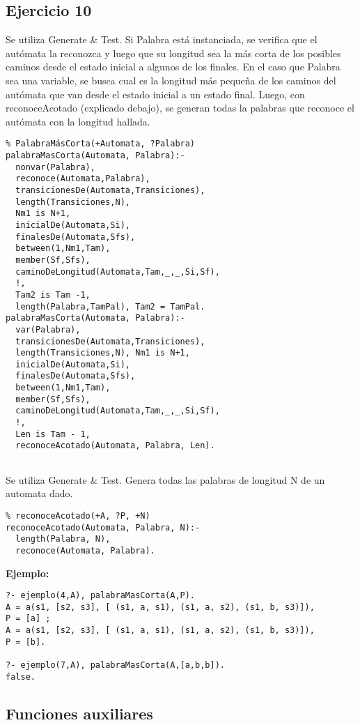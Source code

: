 \documentclass[10pt, a4paper,english,spanish,hidelinks]{article}
\begin{document}
\subsection{Ejercicio 10}

Se utiliza Generate \& Test.
Si Palabra está instanciada, se verifica que el autómata la reconozca y luego que su longitud sea
la más corta de los posibles caminos desde el estado inicial a algunos de los finales.
En el caso que Palabra sea una variable, se busca cual es la longitud más pequeña de los caminos del autómata
que van desde el estado inicial a un estado final. Luego, con reconoceAcotado (explicado debajo), se generan
todas la palabras que reconoce el autómata con la longitud hallada.

\begin{verbatim}
% PalabraMásCorta(+Automata, ?Palabra)
palabraMasCorta(Automata, Palabra):-
  nonvar(Palabra),
  reconoce(Automata,Palabra),
  transicionesDe(Automata,Transiciones),
  length(Transiciones,N),
  Nm1 is N+1,
  inicialDe(Automata,Si),
  finalesDe(Automata,Sfs),
  between(1,Nm1,Tam),
  member(Sf,Sfs),
  caminoDeLongitud(Automata,Tam,_,_,Si,Sf),
  !,
  Tam2 is Tam -1,
  length(Palabra,TamPal), Tam2 = TamPal.
palabraMasCorta(Automata, Palabra):-
  var(Palabra),
  transicionesDe(Automata,Transiciones),
  length(Transiciones,N), Nm1 is N+1,
  inicialDe(Automata,Si),
  finalesDe(Automata,Sfs),
  between(1,Nm1,Tam),
  member(Sf,Sfs),
  caminoDeLongitud(Automata,Tam,_,_,Si,Sf),
  !,
  Len is Tam - 1,
  reconoceAcotado(Automata, Palabra, Len).


\end{verbatim}
							
Se utiliza Generate \& Test.
Genera todas las palabras de longitud N de un automata dado.
\begin{verbatim}
% reconoceAcotado(+A, ?P, +N)
reconoceAcotado(Automata, Palabra, N):-
  length(Palabra, N),
  reconoce(Automata, Palabra).

\end{verbatim}

\textbf{Ejemplo:}
\begin{verbatim}
?- ejemplo(4,A), palabraMasCorta(A,P).
A = a(s1, [s2, s3], [ (s1, a, s1), (s1, a, s2), (s1, b, s3)]),
P = [a] ;
A = a(s1, [s2, s3], [ (s1, a, s1), (s1, a, s2), (s1, b, s3)]),
P = [b].

?- ejemplo(7,A), palabraMasCorta(A,[a,b,b]).
false.
\end{verbatim}


\subsection{Funciones auxiliares}
\end{document}
